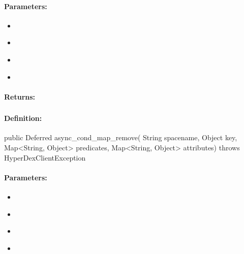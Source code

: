 \paragraph{Parameters:}
\begin{itemize}[noitemsep]
\item {}\\

\item {}\\

\item {}\\

\item {}\\

\end{itemize}

\paragraph{Returns:}


\pagebreak
\subsubsection{}
\label{api:java:async_cond_map_remove}


\paragraph{Definition:}
\begin{javacode}
public Deferred async_cond_map_remove(
        String spacename,
        Object key,
        Map<String, Object> predicates,
        Map<String, Object> attributes) throws HyperDexClientException
\end{javacode}

\paragraph{Parameters:}
\begin{itemize}[noitemsep]
\item {}\\

\item {}\\

\item {}\\

\item {}\\

\end{itemize}

